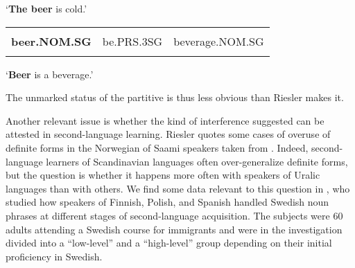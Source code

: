 \begin{styleTranslation}
‘\textbf{The beer} is cold.’

\end{styleTranslation}


\begin{listWWNumileveli}
\item 

\end{listWWNumileveli}

\begin{tabular}{lll}
\lsptoprule
\multicolumn{3}{l}{{\bfseries Olut}

}\\
{\bfseries beer.NOM.SG} & be.PRS.3SG & beverage.NOM.SG\\
\lspbottomrule
\end{tabular}

\begin{styleTranslation}
‘\textbf{Beer} is a beverage.’

\end{styleTranslation}

\begin{styleBodyTextFirst}
The unmarked status of the partitive is thus less obvious than Riesler makes it. 

\end{styleBodyTextFirst}

\begin{styleBodytextC}
Another relevant issue is whether the kind of interference suggested can be attested in second-language learning. Riesler quotes some cases of overuse of definite forms in the Norwegian of Saami speakers taken from \citet{Bull1995}. Indeed, second-language learners of Scandinavian languages often over-generalize definite forms, but the question is whether it happens more often with speakers of Uralic languages than with others. We find some data relevant to this question in \citet{Axelsson1994}, who studied how speakers of Finnish, Polish, and Spanish handled Swedish noun phrases at different stages of second-language acquisition. The subjects were 60 adults attending a Swedish course for immigrants and were in the investigation divided into a “low-level” and a “high-level” group depending on their initial proficiency in Swedish.

\end{styleBodytextC}

